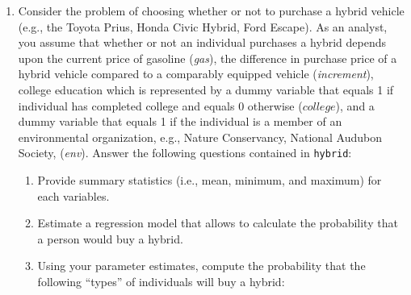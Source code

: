 \documentclass[
]{article}
\begin{document}
\begin{enumerate}
\def\labelenumi{\arabic{enumi}.}
\item
  Consider the problem of choosing whether or not to purchase a hybrid vehicle (e.g., the Toyota Prius, Honda Civic Hybrid, Ford Escape). As an analyst, you assume that whether or not an individual purchases a hybrid depends upon the current price of gasoline (\emph{gas}), the difference in purchase price of a hybrid vehicle compared to a comparably equipped vehicle (\emph{increment}), college education which is represented by a dummy variable that equals 1 if individual has completed college and equals 0 otherwise (\(college\)), and a dummy variable that equals 1 if the individual is a member of an environmental organization, e.g., Nature Conservancy, National Audubon Society, (\emph{env}). Answer the following questions contained in \texttt{hybrid}:

  \begin{enumerate}
  \def\labelenumii{\alph{enumii}.}
  \item
    Provide summary statistics (i.e., mean, minimum, and maximum) for each variables.
  \item
    Estimate a regression model that allows to calculate the probability that a person would buy a hybrid.
  \item
    Using your parameter estimates, compute the probability that the following ``types'' of individuals will buy a hybrid:


\end{enumerate}
\end{enumerate}
\end{document}
